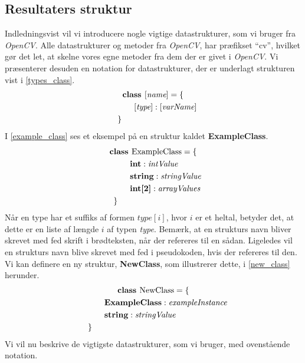 {\subsection{Resultaters struktur\label{resultat_struktur}}
Indledningsvist vil vi introducere nogle vigtige datastrukturer, som vi
bruger fra \emph{OpenCV}. Alle datastrukturer og metoder fra
\emph{OpenCV}, har præfikset ``cv'', hvilket gør det let, at skelne
vores egne metoder fra dem der er givet i \emph{OpenCV}. Vi præsenterer
desuden en notation for datastrukturer, der er underlagt strukturen vist
i \eqref{types_class}.
\begin{multline}
    \textbf{class~} [\textit{name}] = \{ \\
    \shoveleft{\qquad[\textit{type}] : [\textit{varName}]} \\
    \shoveleft{\}}\shoveright{}
    \label{types_class}
\end{multline}
I \eqref{example_class} ses et eksempel på en struktur kaldet
\textbf{ExampleClass}.
\begin{multline}
    \textbf{class~} \textrm{ExampleClass} = \{ \\
    \shoveleft{\qquad\textbf{int} : \textit{intValue}} \\
    \shoveleft{\qquad\textbf{string} : \textit{stringValue}} \\
    \shoveleft{\qquad\textbf{int[2]} : \textit{arrayValues}} \\
    \shoveleft{\}}\shoveright{}
    \label{example_class}
\end{multline}
Når en type har et suffiks af formen $\textit{type}[i]$, hvor $i$ er et
heltal, betyder det, at dette er en liste af længde $i$ af typen
\textit{type}.  Bemærk, at en strukturs navn bliver skrevet med fed
skrift i brødteksten, når der refereres til en sådan. Ligeledes vil en
strukturs navn blive skrevet med fed i pseudokoden, hvis der refereres
til den. Vi kan definere en ny struktur, \textbf{NewClass}, som
illustrerer dette, i \eqref{new_class} herunder.
\begin{multline}
    \textbf{class~} \textrm{NewClass} = \{ \\
    \shoveleft{\qquad\textbf{ExampleClass} : \textit{exampleInstance}} \\
    \shoveleft{\qquad\textbf{string} : \textit{stringValue}} \\
    \shoveleft{\}}\shoveright{}
    \label{new_class}
\end{multline}
Vi vil nu beskrive de vigtigste datastrukturer, som vi bruger, med
ovenstående notation.

}
